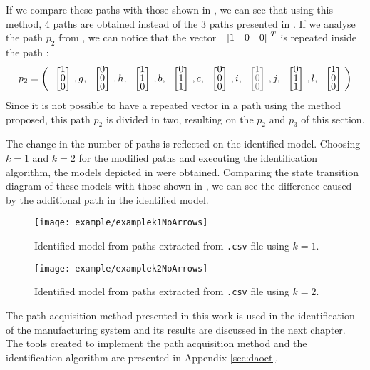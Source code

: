 If we compare these paths with those shown in ,
we can see that using this method, 4 paths are obtained instead of the 3 paths presented in .
If we analyse the path $p_2$ from , we can notice that the vector $\colvec{1&0&0}^ T$ is repeated inside the path :
\begin{align*}
  p_2&= \left(\colvec{1\\0\\0},g,\colvec{0\\0\\0},h,\colvec{1\\1\\0},b,\colvec{0\\1\\1},c,\colvec{0\\0\\0},i,{\color{gray} \colvec{1\\0\\0}},j,\colvec{0\\1\\1},l,\colvec{1\\0\\0}\right) \\
\end{align*}
Since it is not possible to have a repeated vector in a path using the method proposed, this path $p_2$ is divided in two, resulting on the $p_2$ and $p_3$ of this section. 

 The change in the number of paths is reflected on the
 identified model. Choosing $k=1$ and $k=2$ for the modified paths and executing the identification algorithm, the models depicted in  were obtained.
Comparing the state transition diagram of these models with those shown in , we can see the difference
caused by the additional path in the identified model.
\begin{figure}[H]
  \centering
  \texttt{[image: example/examplek1NoArrows]}
  \caption{Identified model from paths extracted from \texttt{.csv} file using $k=1$.}
  \label{fig:identExamplekone}
\end{figure}

\begin{figure}[H]
  \centering
  \centering
  \texttt{[image: example/examplek2NoArrows]}
  \caption{Identified model from paths extracted from \texttt{.csv} file using $k=2$.}
  \label{fig:identExamplektwo}
\end{figure}

The path acquisition method presented in this work is used in the identification of the manufacturing system and its results are discussed in the next chapter. 
The tools created to implement the path acquisition method and the
identification algorithm are presented in Appendix \ref{sec:daoct}.


